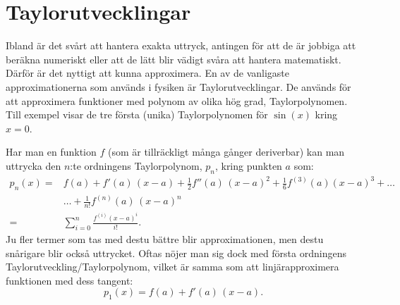 \documentclass[11pt,a4paper, swedish
]{article}
\newcounter{exempel_counter}%
\begin{document}
%
\clearpage
\appendix





\section{Taylorutvecklingar}\label{sec:Taylor}
\begin{figure}
\centering

\caption{}
\label{fig:taylor_sin}
\end{figure}

Ibland är det svårt att hantera exakta uttryck, antingen för att de är
jobbiga att beräkna numeriskt eller att de lätt blir vädigt svåra att
hantera matematiskt. Därför är det nyttigt att kunna approximera. En
av de vanligaste approximationerna som används i fysiken är
Taylorutvecklingar\footnotemark{}. De används för att approximera
funktioner med polynom av olika hög grad, Taylorpolynomen. Till
exempel visar  de tre första (unika)
Taylorpolynomen för $\sin(x)$ kring $x=0$.

Har man en funktion $f$ (som är tillräckligt många gånger deriverbar)
kan man uttrycka den $n$:te ordningens Taylorpolynom, $p_n$, kring punkten
$a$ som:
\begin{equation}
\begin{aligned}
p_n(x) =& f(a) + f'(a)\,(x-a) + \frac{1}{2} f''(a)\,(x-a)^2 
 + \frac{1}{6} f^{(3)}(a)(x-a)^3 + \ldots\\
 & \ldots + \frac{1}{n!}f^{(n)}(a)\,(x-a)^n\\
=& \sum_{i=0}^{n} \frac{f^{(i)}(x-a)^i}{i!}.
\end{aligned}
\end{equation}
Ju fler termer som tas med destu bättre blir approximationen, men
destu snårigare blir också uttrycket. 
Oftas nöjer man sig dock med första ordningens
Taylorutveckling/Taylorpolynom, vilket är samma som att
linjärapproximera funktionen med dess tangent:
\begin{equation}
p_1(x) = f(a) + f'(a)\,(x-a).
\end{equation}
\end{document}
